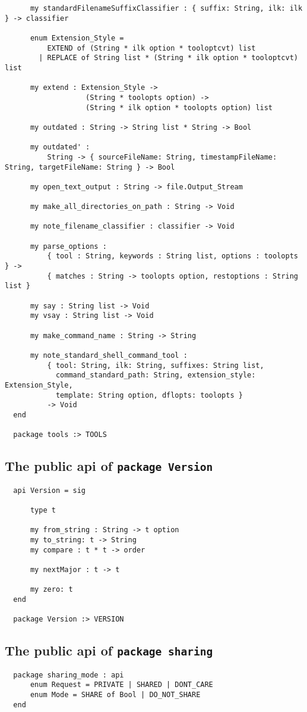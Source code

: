 \begin{small}
\begin{verbatim}
      my standardFilenameSuffixClassifier : { suffix: String, ilk: ilk } -> classifier
  
      enum Extension_Style =
          EXTEND of (String * ilk option * tooloptcvt) list
        | REPLACE of String list * (String * ilk option * tooloptcvt) list
  
      my extend : Extension_Style ->
                   (String * toolopts option) ->
                   (String * ilk option * toolopts option) list
  
      my outdated : String -> String list * String -> Bool
  
      my outdated' :
          String -> { sourceFileName: String, timestampFileName: String, targetFileName: String } -> Bool
  
      my open_text_output : String -> file.Output_Stream
  
      my make_all_directories_on_path : String -> Void
  
      my note_filename_classifier : classifier -> Void
  
      my parse_options :
          { tool : String, keywords : String list, options : toolopts } ->
          { matches : String -> toolopts option, restoptions : String list }
  
      my say : String list -> Void
      my vsay : String list -> Void
  
      my make_command_name : String -> String
  
      my note_standard_shell_command_tool :
          { tool: String, ilk: String, suffixes: String list,
            command_standard_path: String, extension_style: Extension_Style,
            template: String option, dflopts: toolopts }
          -> Void
  end
  
  package tools :> TOOLS
\end{verbatim}
\end{small}

\subsection{The public api of {\tt package Version}}

\begin{small}
\begin{verbatim}
  api Version = sig
  
      type t
  
      my from_string : String -> t option
      my to_string: t -> String
      my compare : t * t -> order
  
      my nextMajor : t -> t
  
      my zero: t
  end
  
  package Version :> VERSION
\end{verbatim}
\end{small}

\subsection{The public api of {\tt package sharing}}

\begin{small}
\begin{verbatim}
  package sharing_mode : api
      enum Request = PRIVATE | SHARED | DONT_CARE
      enum Mode = SHARE of Bool | DO_NOT_SHARE
  end
\end{verbatim}
\end{small}
